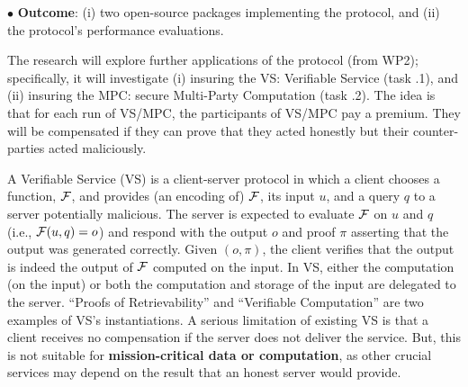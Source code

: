  \noindent$\bullet$\textbf{ Outcome}:  (i)  two open-source packages implementing the protocol, and (ii) the protocol's performance evaluations. %
 
 
\vs
\noindent{}

\vs

 The research will explore further applications of the protocol (from WP2); specifically, it will investigate (i) insuring the VS: Verifiable Service (task \4.1), and (ii) insuring the MPC: secure Multi-Party Computation (task \4.2). The idea is that for each run of VS/MPC, the participants of  VS/MPC pay a premium. They will be compensated if they can prove that they acted honestly but their counter-parties acted maliciously. 
 
 
A Verifiable Service (VS) is a client-server protocol in which a client chooses a function, $\mathcal{F}$,
and provides (an encoding of) $\mathcal{F}$, its input $u$, and a query $q$ to a server potentially malicious. The server is expected to evaluate
$\mathcal{F}$ on $u$ and $q$ (i.e., $\mathcal{F}(u, q)=o$) and respond with the output $o$ and proof $\pi$ asserting that the output was generated correctly. Given $(o, \pi)$, the client verifies that the output is indeed the output of $\mathcal{F}$ computed on the input. In VS, either the
computation (on the input) or both the computation and storage of the input are delegated to the server. ``Proofs of Retrievability''  and  ``Verifiable Computation'' are two examples of VS's instantiations. A serious limitation of existing VS is that a client receives no compensation if the server does not deliver the service. But, this is not suitable for \textbf{mission-critical data or computation}, as other crucial services may depend on the result that an honest server would provide. 


